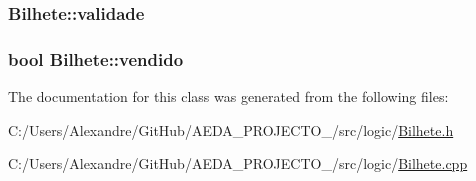 \subsubsection[{validade}]{ Bilhete\+::validade\hspace{0.3cm}{\ttfamily [private]}}\label{class_bilhete_adba6ea2eaaf920db79ed76698d7dcee6}
\hypertarget{class_bilhete_abd52894914c56adb4fccf8a9c73a8c95}{}
\subsubsection[{vendido}]{\setlength{\rightskip}{0pt plus 5cm}bool Bilhete\+::vendido\hspace{0.3cm}{\ttfamily [private]}}\label{class_bilhete_abd52894914c56adb4fccf8a9c73a8c95}


The documentation for this class was generated from the following files\+:\begin{DoxyCompactItemize}
\item 
C\+:/\+Users/\+Alexandre/\+Git\+Hub/\+A\+E\+D\+A\+\_\+\+P\+R\+O\+J\+E\+C\+T\+O\+\_/src/logic/\hyperlink{_bilhete_8h}{Bilhete.\+h}\item 
C\+:/\+Users/\+Alexandre/\+Git\+Hub/\+A\+E\+D\+A\+\_\+\+P\+R\+O\+J\+E\+C\+T\+O\+\_/src/logic/\hyperlink{_bilhete_8cpp}{Bilhete.\+cpp}\end{DoxyCompactItemize}
